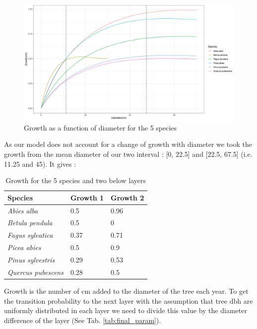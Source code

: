 \documentclass{article}
\begin{document}
\begin{figure}
    \centering
    \includegraphics[width=\textwidth]{Figure/Growth_diameter.png}
    \caption{Growth as a function of diameter for the 5 species}
    \label{fig:growth_diameter}
\end{figure}

As our model does not account for a change of growth with diameter we took the growth from the mean diameter of our two interval : [0, 22.5] and [22.5, 67.5] (i.e. 11.25 and 45). It gives :

\begin{table}[H]
\begin{center}
    \begin{tabular}{lll}
    \hline
    Species & Growth 1 & Growth 2 \\ \hline
    \textit{Abies alba} & 0.5 & 0.96 \\
    \textit{Betula pendula} & 0.5 & 0 \\
    \textit{Fagus sylvatica} & 0.37 & 0.71 \\
    \textit{Picea abies} & 0.5 & 0.9 \\
    \textit{Pinus sylvestris} & 0.29 & 0.53 \\
    \textit{Quercus pubescens} & 0.28 & 0.5 \\ \hline
    \end{tabular}
    \caption{Growth for the 5 species and two below layers}
\end{center}
\end{table}

Growth is the number of cm added to the diameter of the tree each year. To get the transition probability to the next layer with the assumption that tree dbh are uniformly distributed in each layer we need to divide this value by the diameter difference of the layer (See Tab. \ref{tab:final_param}).
\end{document}
